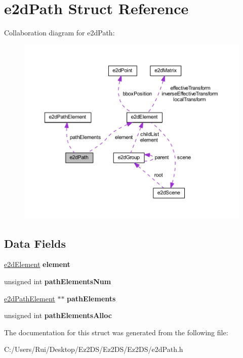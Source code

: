 \hypertarget{structe2d_path}{\section{e2d\-Path Struct Reference}
\label{structe2d_path}
}


Collaboration diagram for e2d\-Path\-:\nopagebreak
\begin{figure}[H]
\begin{center}
\leavevmode
\includegraphics[width=350pt]{structe2d_path__coll__graph}
\end{center}
\end{figure}
\subsection*{Data Fields}
\begin{DoxyCompactItemize}
\item 
\hypertarget{structe2d_path_a55bc7a3a0af41fba9e5b91f390c5928c}{\hyperlink{structe2d_element}{e2d\-Element} {\bfseries element}}\label{structe2d_path_a55bc7a3a0af41fba9e5b91f390c5928c}

\item 
\hypertarget{structe2d_path_a225f71916c061d0c977a1e5fae371a99}{unsigned int {\bfseries path\-Elements\-Num}}\label{structe2d_path_a225f71916c061d0c977a1e5fae371a99}

\item 
\hypertarget{structe2d_path_ac0c8a45ff4f8d02e557fb33887743439}{\hyperlink{structe2d_path_element}{e2d\-Path\-Element} $\ast$$\ast$ {\bfseries path\-Elements}}\label{structe2d_path_ac0c8a45ff4f8d02e557fb33887743439}

\item 
\hypertarget{structe2d_path_a0922122c6ccf006fad850c6b30ae5328}{unsigned int {\bfseries path\-Elements\-Alloc}}\label{structe2d_path_a0922122c6ccf006fad850c6b30ae5328}

\end{DoxyCompactItemize}


The documentation for this struct was generated from the following file\-:\begin{DoxyCompactItemize}
\item 
C\-:/\-Users/\-Rui/\-Desktop/\-Ez2\-D\-S/\-Ez2\-D\-S/\-Ez2\-D\-S/e2d\-Path.\-h\end{DoxyCompactItemize}
